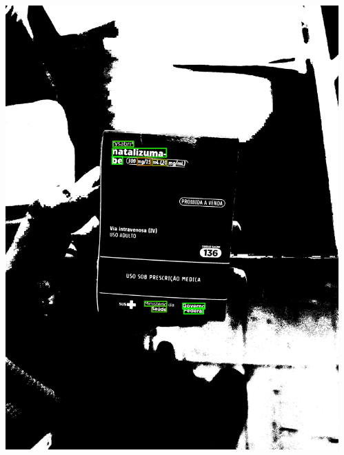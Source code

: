 \begin{frame}
\begin{columns}
\begin{column}{0.24\textwidth}
			\includegraphics[height=0.35\textheight]{../pictures/tysabri_b_thresh_recomposed_cmyk_boxes.jpg}
		\end{column}
		\begin{column}{0.24\textwidth}\centering

\end{column}
\end{columns}
\end{frame}
